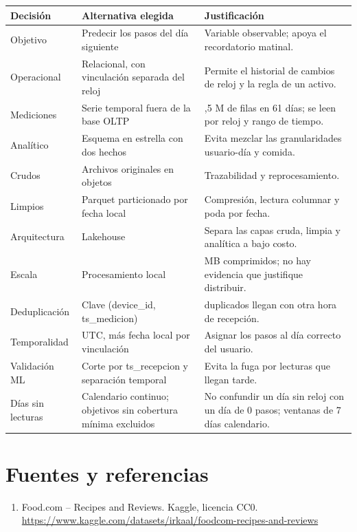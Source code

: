 \documentclass[11pt]{article}
\begin{document}
{\renewcommand{\arraystretch}{1.25}
\begin{longtable}{@{}>{\raggedright\arraybackslash}p{3.1cm}>{\raggedright\arraybackslash}p{6.1cm}>{\raggedright\arraybackslash}p{8.7cm}@{}}
\toprule
\textbf{Decisión} & \textbf{Alternativa elegida} &
\textbf{Justificación}\\
\midrule
\endhead
Objetivo & Predecir los pasos del día siguiente &
Variable observable; apoya el recordatorio matinal.\\
Operacional & Relacional, con vinculación separada del reloj &
Permite el historial de cambios de reloj y la regla de un activo.\\
Mediciones & Serie temporal fuera de la base OLTP &
15,5 M de filas en 61 días; se leen por reloj y rango de tiempo.\\
Analítico & Esquema en estrella con dos hechos &
Evita mezclar las granularidades usuario-día y comida.\\
Crudos & Archivos originales en objetos &
Trazabilidad y reprocesamiento.\\
Limpios & Parquet particionado por fecha local &
Compresión, lectura columnar y poda por fecha.\\
Arquitectura & Lakehouse &
Separa las capas cruda, limpia y analítica a bajo costo.\\
Escala & Procesamiento local &
115 MB comprimidos; no hay evidencia que justifique distribuir.\\
Deduplicación & Clave (device\_id, ts\_medicion) &
300.015 duplicados llegan con otra hora de recepción.\\
Temporalidad & UTC, más fecha local por vinculación &
Asignar los pasos al día correcto del usuario.\\
Validación ML & Corte por ts\_recepcion y separación temporal &
Evita la fuga por lecturas que llegan tarde.\\
Días sin lecturas & Calendario continuo; objetivos sin cobertura
mínima excluidos &
No confundir un día sin reloj con un día de 0 pasos; ventanas de
7 días calendario.\\
\bottomrule
\end{longtable}
}

\section{Fuentes y referencias}

\begin{enumerate}
    \item Food.com -- Recipes and Reviews. Kaggle, licencia CC0.\\
    {\small\url{https://www.kaggle.com/datasets/irkaal/foodcom-recipes-and-reviews}}
\end{enumerate}
\end{document}
